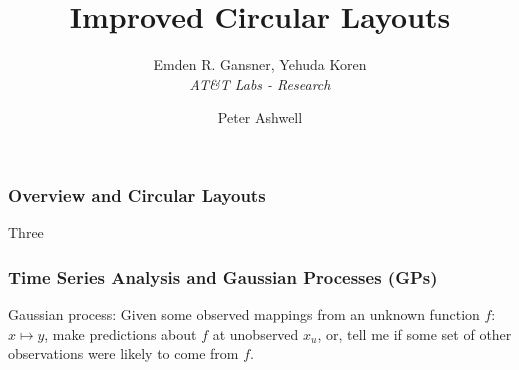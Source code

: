 \documentclass[12pt]{beamer}
\subtitle{Emden R. Gansner, Yehuda Koren \\ \emph{AT\&T Labs - Research}}
\title{Improved Circular Layouts}
\date{}
\author{Peter Ashwell}
\begin{document}
\maketitle

\begin{frame}
	\frametitle{Overview and Circular Layouts}
	\begin{figure}
	  \centering
	\end{figure}
	Three 

\end{frame}

\begin{frame}
	\frametitle{Time Series Analysis and Gaussian Processes (GPs)}
	\begin{figure}
		\captionsetup[subfigure]{labelformat=empty}
	\end{figure}
  Gaussian process: Given some observed mappings from an unknown function $f$: $x \mapsto y$, make predictions about $f$ at unobserved $x_{u}$, or, tell me if some set of other observations were likely to come from $f$.
\end{frame}
\end{document}
